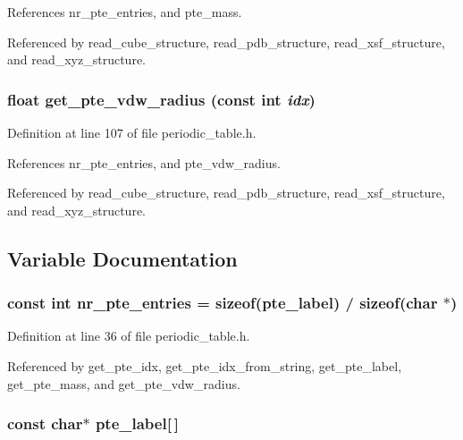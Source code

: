 References nr\_\-pte\_\-entries, and pte\_\-mass.

Referenced by read\_\-cube\_\-structure, read\_\-pdb\_\-structure, read\_\-xsf\_\-structure, and read\_\-xyz\_\-structure.
\subsubsection{\setlength{\rightskip}{0pt plus 5cm}float get\_\-pte\_\-vdw\_\-radius (const int {\em idx})\hspace{0.3cm}{\tt  [static]}}\label{periodic__table_8h_a6}




Definition at line 107 of file periodic\_\-table.h.

References nr\_\-pte\_\-entries, and pte\_\-vdw\_\-radius.

Referenced by read\_\-cube\_\-structure, read\_\-pdb\_\-structure, read\_\-xsf\_\-structure, and read\_\-xyz\_\-structure.

\subsection{Variable Documentation}
\subsubsection{\setlength{\rightskip}{0pt plus 5cm}const int nr\_\-pte\_\-entries = sizeof({\bf pte\_\-label}) / sizeof(char $\ast$)\hspace{0.3cm}{\tt  [static]}}\label{periodic__table_8h_a1}




Definition at line 36 of file periodic\_\-table.h.

Referenced by get\_\-pte\_\-idx, get\_\-pte\_\-idx\_\-from\_\-string, get\_\-pte\_\-label, get\_\-pte\_\-mass, and get\_\-pte\_\-vdw\_\-radius.
\subsubsection{\setlength{\rightskip}{0pt plus 5cm}const char$\ast$ pte\_\-label[$\,$]\hspace{0.3cm}{\tt  [static]}}\label{periodic__table_8h_a0}


